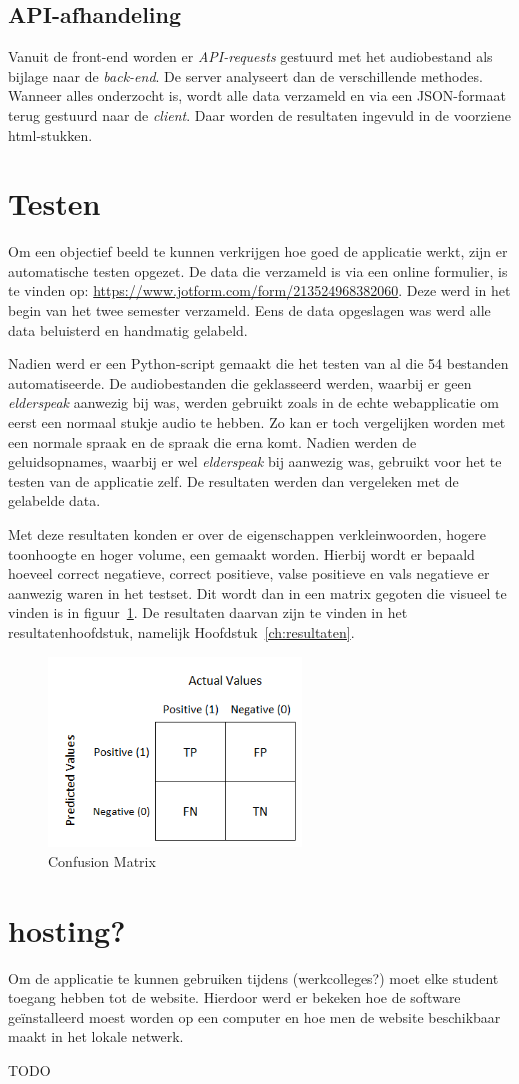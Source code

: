\subsection{API-afhandeling}
Vanuit de front-end worden er \textit{API-requests} gestuurd met het audiobestand als bijlage naar de \textit{back-end}. De server analyseert dan de verschillende methodes. Wanneer alles onderzocht is, wordt alle data verzameld en via een JSON-formaat terug gestuurd naar de \textit{client}. Daar worden de resultaten ingevuld in de voorziene html-stukken.

\section{Testen}
Om een objectief beeld te kunnen verkrijgen hoe goed de applicatie werkt, zijn er automatische testen opgezet. De data die verzameld is via een online formulier, is te vinden op:  \url{https://www.jotform.com/form/213524968382060}. Deze werd in het begin van het twee semester verzameld. Eens de data opgeslagen was werd alle data beluisterd en handmatig gelabeld.

Nadien werd er een Python-script gemaakt die het testen van al die 54 bestanden automatiseerde. De audiobestanden die geklasseerd werden, waarbij er geen \textit{elderspeak} aanwezig bij was, werden gebruikt zoals in de echte webapplicatie om eerst een normaal stukje audio te hebben. Zo kan er toch vergelijken worden met een normale spraak en de spraak die erna komt. Nadien werden de geluidsopnames,  waarbij er wel \textit{elderspeak} bij aanwezig was, gebruikt voor het te testen van de applicatie zelf. De resultaten werden dan vergeleken met de gelabelde data.

Met deze resultaten konden er over de eigenschappen verkleinwoorden, hogere toonhoogte en hoger volume, een  gemaakt worden. Hierbij wordt er bepaald hoeveel correct negatieve, correct positieve, valse positieve en vals negatieve er aanwezig waren in het testset. Dit wordt dan in een matrix gegoten die visueel te vinden is in figuur~\ref{fig:confusion_matrix}. De resultaten daarvan zijn te vinden in het resultatenhoofdstuk, namelijk Hoofdstuk~\ref{ch:resultaten}.

\begin{figure}
    \centering
    \includegraphics[width=0.6\textwidth]{./img/confusion_matrix}
    \caption{\label{fig:confusion_matrix} Confusion Matrix~\autocite{Jain2020}}
\end{figure}

\section{hosting?}
Om de applicatie te kunnen gebruiken tijdens (werkcolleges?) moet elke student toegang hebben tot de website. Hierdoor werd er bekeken hoe de software geïnstalleerd moest worden op een computer en hoe men de website beschikbaar maakt in het lokale netwerk.

TODO
